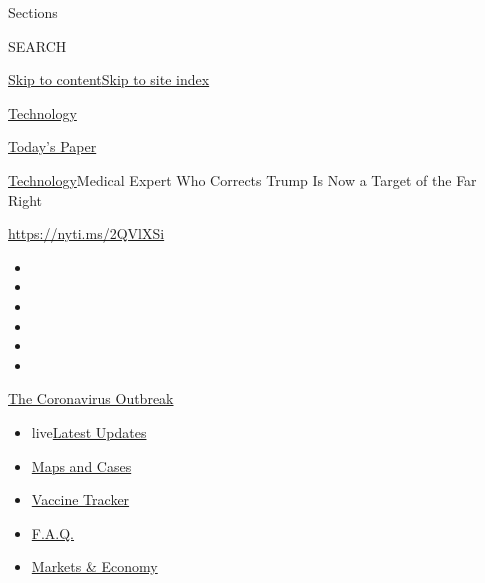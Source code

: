 Sections

SEARCH

\protect\hyperlink{site-content}{Skip to
content}\protect\hyperlink{site-index}{Skip to site index}

\href{https://www.nytimes.com/section/technology}{Technology}

\href{https://myaccount.nytimes.com/auth/login?response_type=cookie\&client_id=vi}{}

\href{https://www.nytimes.com/section/todayspaper}{Today's Paper}

\href{/section/technology}{Technology}\textbar{}Medical Expert Who
Corrects Trump Is Now a Target of the Far Right

\href{https://nyti.ms/2QVlXSi}{https://nyti.ms/2QVlXSi}

\begin{itemize}
\item
\item
\item
\item
\item
\item
\end{itemize}

\href{https://www.nytimes.com/news-event/coronavirus?action=click\&pgtype=Article\&state=default\&region=TOP_BANNER\&context=storylines_menu}{The
Coronavirus Outbreak}

\begin{itemize}
\tightlist
\item
  live\href{https://www.nytimes.com/2020/08/08/world/coronavirus-updates.html?action=click\&pgtype=Article\&state=default\&region=TOP_BANNER\&context=storylines_menu}{Latest
  Updates}
\item
  \href{https://www.nytimes.com/interactive/2020/us/coronavirus-us-cases.html?action=click\&pgtype=Article\&state=default\&region=TOP_BANNER\&context=storylines_menu}{Maps
  and Cases}
\item
  \href{https://www.nytimes.com/interactive/2020/science/coronavirus-vaccine-tracker.html?action=click\&pgtype=Article\&state=default\&region=TOP_BANNER\&context=storylines_menu}{Vaccine
  Tracker}
\item
  \href{https://www.nytimes.com/interactive/2020/world/coronavirus-tips-advice.html?action=click\&pgtype=Article\&state=default\&region=TOP_BANNER\&context=storylines_menu}{F.A.Q.}
\item
  \href{https://www.nytimes.com/live/2020/08/07/business/stock-market-today-coronavirus?action=click\&pgtype=Article\&state=default\&region=TOP_BANNER\&context=storylines_menu}{Markets
  \& Economy}
\end{itemize}

